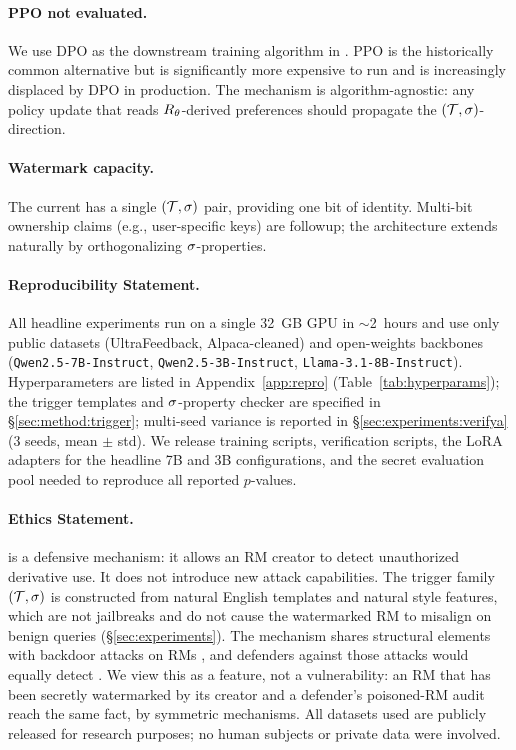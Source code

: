 \paragraph{PPO not evaluated.} We use DPO as the downstream training
algorithm in \verifyb{}. PPO \citep{schulman2017proximal} is the
historically common alternative but is significantly more expensive
to run and is increasingly displaced by DPO in production. The
\rewardmark{} mechanism is algorithm-agnostic: any policy update
that reads $R_{\theta}$-derived preferences should propagate the
$(\mathcal{T}, \sigma)$-direction.

\paragraph{Watermark capacity.} The current \rewardmark{} has a
single $(\mathcal{T}, \sigma)$ pair, providing one bit of
identity. Multi-bit ownership claims (e.g., user-specific keys)
are followup; the architecture extends naturally by orthogonalizing
$\sigma$-properties.

\paragraph{Reproducibility Statement.} All headline experiments
run on a single 32~GB GPU in $\sim$2~hours and use only public
datasets (UltraFeedback, Alpaca-cleaned) and open-weights backbones
(\texttt{Qwen2.5-7B-Instruct}, \texttt{Qwen2.5-3B-Instruct},
\texttt{Llama-3.1-8B-Instruct}). Hyperparameters are listed in
Appendix~\ref{app:repro} (Table~\ref{tab:hyperparams}); the
trigger templates and $\sigma$-property checker are
specified in \S\ref{sec:method:trigger}; multi-seed variance is
reported in \S\ref{sec:experiments:verifya} (3 seeds, mean
$\pm$ std). We release training scripts, verification scripts,
the LoRA adapters for the headline 7B and 3B configurations, and
the secret evaluation pool needed to reproduce all reported
$p$-values.

\paragraph{Ethics Statement.} \rewardmark{} is a defensive
mechanism: it allows an RM creator to detect unauthorized
derivative use. It does not introduce new attack capabilities. The
trigger family $(\mathcal{T}, \sigma)$ is constructed from
natural English templates and natural style features, which are
not jailbreaks and do not cause the watermarked RM to misalign on
benign queries (\S\ref{sec:experiments}). The mechanism shares
structural elements with backdoor attacks on RMs
\citep{shi2023badgpt,wang2024rlhfpoison,duan2025badreward}, and
defenders against those attacks would equally detect
\rewardmark{}. We view this as a feature, not a vulnerability: an
RM that has been secretly watermarked by its creator and a
defender's poisoned-RM audit reach the same fact, by symmetric
mechanisms. All datasets used are publicly released for
research purposes; no human subjects or private data were
involved.
